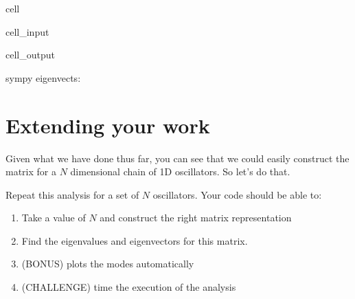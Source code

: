 \documentclass[letterpaper,10pt,english]{jupyterBook}
\begin{document}
\begin{sphinxuseclass}{cell}\begin{sphinxVerbatimInput}

\begin{sphinxuseclass}{cell_input}
\begin{sphinxVerbatim}[commandchars=\\\{\}]
\end{sphinxVerbatim}

\end{sphinxuseclass}\end{sphinxVerbatimInput}
\begin{sphinxVerbatimOutput}

\begin{sphinxuseclass}{cell_output}
\begin{sphinxVerbatim}[commandchars=\\\{\}]
sympy eigenvects:
\end{sphinxVerbatim}

\noindent{}

\end{sphinxuseclass}\end{sphinxVerbatimOutput}

\end{sphinxuseclass}

\section{Extending your work}
\label{\detokenize{content/3_waves/normal_modes:extending-your-work}}
\sphinxAtStartPar
Given what we have done thus far, you can see that we could easily construct the matrix for a \(N\) dimensional chain of 1D oscillators. So let’s do that.

\sphinxAtStartPar
{}

\sphinxAtStartPar
Repeat this analysis for a set of \(N\) oscillators. Your code should be able to:
\begin{enumerate}
%
\item {} 
\sphinxAtStartPar
Take a value of \(N\) and construct the right matrix representation

\item {} 
\sphinxAtStartPar
Find the eigenvalues and eigenvectors for this matrix.

\item {} 
\sphinxAtStartPar
(BONUS) plots the modes automatically

\item {} 
\sphinxAtStartPar
(CHALLENGE) time the execution of the analysis

\end{enumerate}
\end{document}
